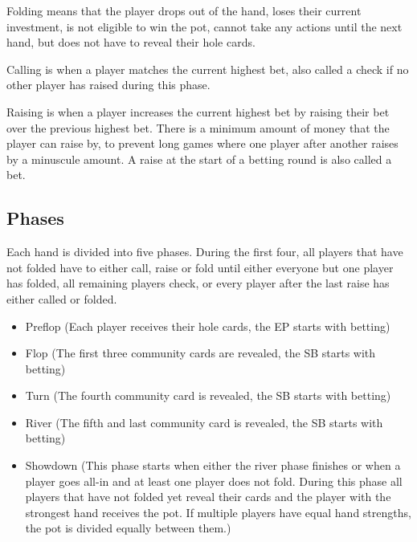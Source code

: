 Folding means that the player drops out of the hand, loses their current investment, is not eligible to win the pot, cannot take any actions until the next hand, but does not have to reveal their hole cards.

Calling is when a player matches the current highest bet, also called a check if no other player has raised during this phase.

Raising is when a player increases the current highest bet by raising their bet over the previous highest bet. There is a minimum amount of money that the player can raise by, to prevent long games where one player after another raises by a minuscule amount. A raise at the start of a betting round is also called a bet.

\subsection{Phases}
Each hand is divided into five phases. During the first four, all players that have not folded have to either call, raise or fold until either everyone but one player has folded, all remaining players check, or every player after the last raise has either called or folded.

\begin{itemize}
  \item Preflop (Each player receives their hole cards, the EP starts with betting)
  \item Flop (The first three community cards are revealed, the SB starts with betting)
  \item Turn (The fourth community card is revealed, the SB starts with betting)
  \item River (The fifth and last community card is revealed, the SB starts with betting)
  \item Showdown (This phase starts when either the river phase finishes or when a player goes all-in and at least one player does not fold. During this phase all players that have not folded yet reveal their cards and the player with the strongest hand receives the pot. If multiple players have equal hand strengths, the pot is divided equally between them.)
\end{itemize}

